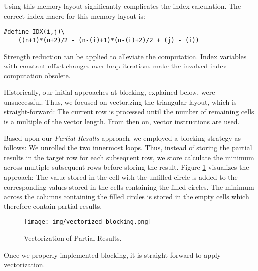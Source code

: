 Using this memory layout significantly complicates the index calculation.
The correct index-macro for this memory layout is:
\begin{center}
	\scriptsize
	\begin{verbatim}#define IDX(i,j)\
	((n+1)*(n+2)/2 - (n-(i)+1)*(n-(i)+2)/2 + (j) - (i))\end{verbatim}
\end{center}
Strength reduction can be applied to alleviate the computation. Index
variables with constant offset changes over loop iterations make the
involved index computation obsolete.

 Historically, our initial approaches at
blocking, explained below, were unsuccessful. Thus, we focused on
vectorizing the triangular layout, which is straight-forward: The current
row is processed until the number of remaining cells is a multiple of the
vector length. From then on, vector instructions are used.

 Based upon our \emph{Partial Results} approach, we employed a
blocking strategy as follows: We unrolled the two innermost loops.
Thus, instead of storing the partial results in the target row for each
subsequent row, we store calculate the minimum across multiple subsequent rows
before storing the result.
Figure \ref{fig:vec-blocking} visualizes the approach: The value stored in the
cell with the unfilled circle is added to the corresponding values stored in the
cells containing the filled circles. The minimum across the columns containing
the filled circles is stored in the empty cells which therefore contain partial
results.

\begin{figure}[htb]\centering
	\texttt{[image: img/vectorized\_blocking.png]}
  \caption{Vectorization of Partial Results.\label{fig:vec-blocking}}
\end{figure}

 Once we properly implemented blocking, it is
straight-forward to apply vectorization.
